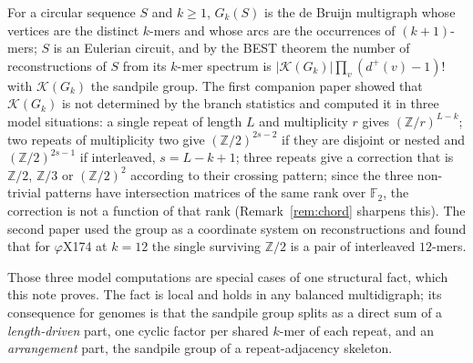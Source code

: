 \documentclass[11pt]{article}
\theoremstyle{plain}
\theoremstyle{definition}
\theoremstyle{remark}
\newcommand{\Z}{\mathbb{Z}}
\newcommand{\F}{\mathbb{F}}
\newcommand{\K}{\mathcal{K}}
\begin{document}
For a circular sequence $S$ and $k\ge1$, $G_k(S)$ is the de Bruijn multigraph whose
vertices are the distinct $k$-mers and whose arcs are the occurrences of $(k{+}1)$-mers;
$S$ is an Eulerian circuit, and by the BEST theorem \cite{AEdB,SmithTutte} the number of
reconstructions of $S$ from its $k$-mer spectrum is $|\K(G_k)|\prod_v(d^+(v)-1)!$ with
$\K(G_k)$ the sandpile group. The first companion paper \cite{Bio1} showed that $\K(G_k)$
is not determined by the branch statistics and computed it in three model situations: a
single repeat of length $L$ and multiplicity $r$ gives $(\Z/r)^{L-k}$; two repeats of
multiplicity two give $(\Z/2)^{2s-2}$ if they are disjoint or nested and $(\Z/2)^{2s-1}$ if
interleaved, $s=L-k+1$; three repeats give a correction that is $\Z/2$, $\Z/3$ or
$(\Z/2)^{2}$ according to their crossing pattern; since the three non-trivial patterns
have intersection matrices of the same rank over $\F_2$, the correction is not a function
of that rank (Remark~\ref{rem:chord} sharpens this). The second
paper \cite{Bio2} used the group as a coordinate system on reconstructions and found that
for $\varphi$X174 at $k=12$ the single surviving $\Z/2$ is a pair of interleaved
$12$-mers.

Those three model computations are special cases of one structural fact, which this note
proves. The fact is local and holds in any balanced multidigraph; its consequence for
genomes is that the sandpile group splits as a direct sum of a \emph{length-driven} part,
one cyclic factor per shared $k$-mer of each repeat, and an \emph{arrangement} part, the
sandpile group of a repeat-adjacency skeleton.
\end{document}
